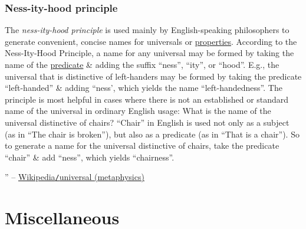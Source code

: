 \documentclass{article}
\begin{document}
\subsubsection{Ness-ity-hood principle}
The {\it ness-ity-hood principle} is used mainly by English-speaking philosophers to generate convenient, concise names for universals or \href{https://en.wikipedia.org/wiki/Property_(philosophy)}{properties}. According to the Ness-Ity-Hood Principle, a name for any universal may be formed by taking the name of the \href{https://en.wikipedia.org/wiki/Predicate_(grammar)}{predicate} \& adding the suffix ``ness'', ``ity'', or ``hood''. E.g., the universal that is distinctive of left-handers may be formed by taking the predicate ``left-handed'' \& adding ``ness', which yields the name ``left-handedness''. The principle is most helpful in cases where there is not an established or standard name of the universal in ordinary English usage: What is the name of the universal distinctive of chairs? ``Chair'' in English is used not only as a subject (as in ``The chair is broken''), but also as a predicate (as in ``That is a chair''). So to generate a name for the universal distinctive of chairs, take the predicate ``chair'' \& add ``ness'', which yields ``chairness''.

'' -- \href{https://en.wikipedia.org/wiki/Universal_(metaphysics)}{Wikipedia{\tt/}universal (metaphysics)}


\section{Miscellaneous}


\printbibliography[heading=bibintoc]
	
\end{document}
